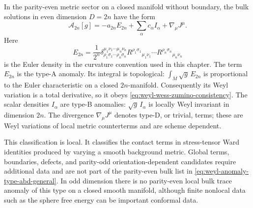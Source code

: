 \begin{quotedtheorem}
\label{qthm:parity-even-local-weyl-anomaly-classes}
In the parity-even metric sector on a closed manifold without boundary, the
bulk solutions in even dimension \(D=2n\) have the form
\begin{equation}
  \mathcal A_{2n}[g]
  =
  -a_{2n}E_{2n}
  +
  \sum_\alpha c_\alpha I_\alpha
  +
  \nabla_\mu J^\mu .
  \label{eq:weyl-anomaly-type-abd-general}
\end{equation}
Here
\begin{equation}
  E_{2n}
  =
  \frac{1}{2^n}
  \delta^{\mu_1\nu_1\cdots\mu_n\nu_n}
         _{\rho_1\sigma_1\cdots\rho_n\sigma_n}
  R^{\rho_1\sigma_1}{}_{\mu_1\nu_1}\cdots
  R^{\rho_n\sigma_n}{}_{\mu_n\nu_n}
  \label{eq:euler-density-general}
\end{equation}
is the Euler density in the curvature convention used in this chapter.  The
term \(E_{2n}\) is the type-A anomaly.  Its integral is topological:
\(\int_M\sqrt g\,E_{2n}\) is proportional to the Euler characteristic on a
closed \(2n\)-manifold.  Consequently its Weyl variation is a total
derivative, so it obeys
\eqref{eq:weyl-wess-zumino-consistency}.  The scalar densities \(I_\alpha\)
are type-B anomalies: \(\sqrt g\,I_\alpha\) is locally Weyl invariant in
dimension \(2n\).  The divergence \(\nabla_\mu J^\mu\) denotes type-D, or
trivial, terms; these are Weyl variations of local metric counterterms and
are scheme dependent.

This classification is local.  It classifies the contact terms in
stress-tensor Ward identities produced by varying a smooth background metric.
Global terms, boundaries, defects, and parity-odd orientation-dependent
candidates require additional data and are not part of the parity-even bulk
list in \eqref{eq:weyl-anomaly-type-abd-general}.  In odd dimension there is
no parity-even local bulk trace anomaly of this type on a closed smooth
manifold, although finite nonlocal data such as the sphere free energy can be
important conformal data.
\end{quotedtheorem}

